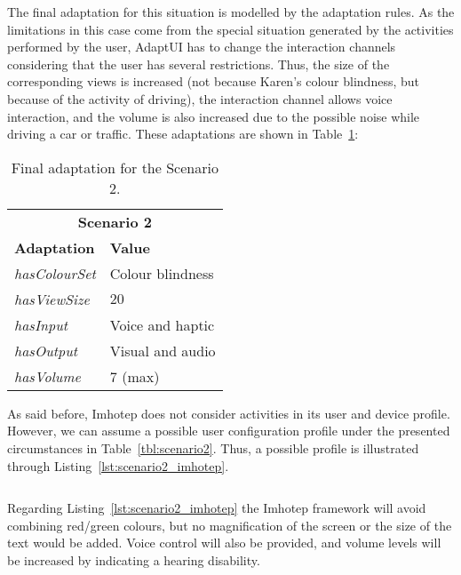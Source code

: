 The final adaptation for this situation is modelled by the adaptation rules.
As the limitations in this case come from the special situation generated by 
the activities performed by the user, AdaptUI has to change the interaction 
channels considering that the user has several restrictions. Thus, the size of 
the corresponding views is increased (not because Karen's colour blindness, but
because of the activity of driving), the interaction channel allows voice 
interaction, and the volume is also increased due to the possible noise while
driving a car or traffic. These adaptations are shown in 
Table~\ref{tbl:final_adaptation_scenario2}:

\begin{table}
 \caption{Final adaptation for the Scenario 2.}
 \label{tbl:final_adaptation_scenario2}
 \footnotesize
 \centering
\begin{tabular}{l l}
  \hline 
    \multicolumn{2}{c}{\textbf{Scenario 2}}		\\
    \textbf{Adaptation} 	& \textbf{Value} 	\\
    \hline
    \textit{hasColourSet}	& Colour blindness 	\\
    \textit{hasViewSize}	& $20$ 			\\
    \textit{hasInput}		& Voice and haptic	\\
    \textit{hasOutput}		& Visual and audio	\\
    \textit{hasVolume}		& $7$ (max) 		\\
  \hline
\end{tabular}
\end{table}

As said before, Imhotep does not consider activities in its user and device 
profile. However, we can assume a possible user configuration profile under the 
presented circumstances in Table~\ref{tbl:scenario2}. Thus, a possible profile
is illustrated through Listing~\ref{lst:scenario2_imhotep}.


\inputminted[linenos=true, fontsize=\footnotesize, frame=lines]{json}{5_experiments_and_results/scenario2_imhotep.json}


Regarding Listing~\ref{lst:scenario2_imhotep} the Imhotep framework will avoid
combining red/green colours, but no magnification of the screen or the size
of the text would be added. Voice control will also be provided, and volume
levels will be increased by indicating a hearing disability.


